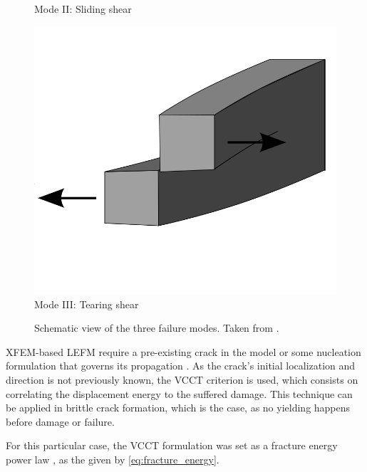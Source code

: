 \documentclass[cmfonts]{witpress}
\begin{document}
\begin{figure}
\begin{minipage}[b]{.3\columnwidth}
			Mode II: Sliding shear
\end{minipage}
\hfill
\begin{minipage}[b]{.3\columnwidth}
	\centering
	\includegraphics[width=\columnwidth]{figures/IMG_CUTRES/wikipedia_failure_modes_3}
			Mode III: Tearing shear
\end{minipage}
	\caption[Schematic view of the three failure modes.]{Schematic view of the three failure modes. Taken from \cite{wiki_fracture_modes}.}
	\label{fig:wikipedia_failure_modes}
\end{figure}

XFEM-based LEFM require a pre-existing crack in the model or some nucleation formulation that governs its propagation \cite{Abaqus613Manual}. As the crack's initial localization and direction is not previously known, the VCCT criterion is used, which consists on correlating the displacement energy to the suffered damage. This technique can be applied in brittle crack formation, which is the case, as no yielding happens before damage or failure.

For this particular case, the VCCT formulation was set as a fracture energy power law \cite{Loureiro2010, Sadowski2010, Sadowski2011, Sadowski2014, SernaMoreno2015}, as the given by \cref{eq:fracture_energy}.
\end{document}
